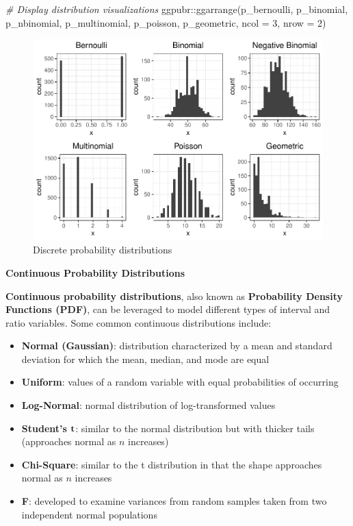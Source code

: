 \documentclass[
]{book}
\newenvironment{Shaded}{\begin{snugshade}}{\end{snugshade}}
\newcommand{\AttributeTok}[1]{\textcolor[rgb]{0.77,0.63,0.00}{#1}}
\newcommand{\CommentTok}[1]{\textcolor[rgb]{0.56,0.35,0.01}{\textit{#1}}}
\newcommand{\DecValTok}[1]{\textcolor[rgb]{0.00,0.00,0.81}{#1}}
\newcommand{\FunctionTok}[1]{\textcolor[rgb]{0.00,0.00,0.00}{#1}}
\newcommand{\NormalTok}[1]{#1}
\newcommand{\SpecialCharTok}[1]{\textcolor[rgb]{0.00,0.00,0.00}{#1}}
\providecommand{\tightlist}{%
  \setlength{\itemsep}{0pt}\setlength{\parskip}{0pt}}
\begin{document}
\begin{Shaded}
\begin{Highlighting}[]
\CommentTok{\# Display distribution visualizations}
\NormalTok{ggpubr}\SpecialCharTok{::}\FunctionTok{ggarrange}\NormalTok{(p\_bernoulli, p\_binomial, p\_nbinomial, p\_multinomial, p\_poisson, p\_geometric,}
          \AttributeTok{ncol =} \DecValTok{3}\NormalTok{, }\AttributeTok{nrow =} \DecValTok{2}\NormalTok{)}
\end{Highlighting}
\end{Shaded}

\begin{figure}

{\centering \includegraphics{The_Fundamentals_of_People_Analytics_files/figure-latex/discrete-dist-1} 

}

\caption{Discrete probability distributions}\label{fig:discrete-dist}
\end{figure}

\textbf{Continuous Probability Distributions}

\textbf{Continuous probability distributions}, also known as \textbf{Probability Density Functions (PDF)}, can be leveraged to model different types of interval and ratio variables. Some common continuous distributions include:

\begin{itemize}
\tightlist
\item
  \textbf{Normal (Gaussian)}: distribution characterized by a mean and standard deviation for which the mean, median, and mode are equal
\item
  \textbf{Uniform}: values of a random variable with equal probabilities of occurring
\item
  \textbf{Log-Normal}: normal distribution of log-transformed values
\item
  \textbf{Student's} \(\textbf t\): similar to the normal distribution but with thicker tails (approaches normal as \(n\) increases)
\item
  \textbf{Chi-Square}: similar to the t distribution in that the shape approaches normal as \(n\) increases
\item
  \textbf{F}: developed to examine variances from random samples taken from two independent normal populations
\end{itemize}
\end{document}
